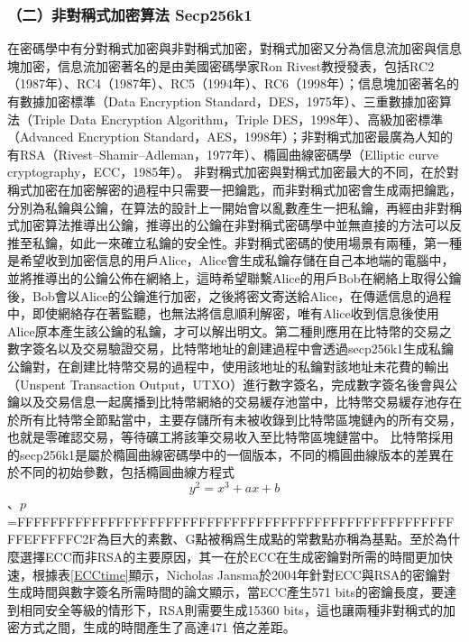 				\subsubsection{（二）非對稱式加密算法 Secp256k1}
				在密碼學中有分對稱式加密與非對稱式加密，對稱式加密又分為信息流加密與信息塊加密，信息流加密著名的是由美國密碼學家Ron Rivest教授發表，包括RC2（1987年）\supercite{OnthedesignandsecurityofRC2}、RC4（1987年）\supercite{Rc4}、RC5（1994年）\supercite{TheRC5encryptionalgorithm}、RC6（1998年）\supercite{TheRC6blockcipher.v1.1August201998}；信息塊加密著名的有數據加密標準（Data Encryption Standard，DES，1975年）\supercite{Dataencryptionstandard}、三重數據加密算法（Triple Data Encryption Algorithm，Triple DES，1998年）\supercite{TrippleDataEncryptionAlgorithmModesofOperation}、高級加密標準（Advanced Encryption Standard，AES，1998年）\supercite{ThedesignofRijndael:AES-theadvancedencryptionstandard}；非對稱式加密最廣為人知的有RSA（Rivest–Shamir–Adleman，1977年）\supercite{Cryptographiccommunicationssystemandmethod}、橢圓曲線密碼學（Elliptic curve cryptography，ECC，1985年）\supercite{Ellipticcurvecryptosystems}。
				非對稱式加密與對稱式加密最大的不同，在於對稱式加密在加密解密的過程中只需要一把鑰匙，而非對稱式加密會生成兩把鑰匙，分別為私鑰與公鑰，在算法的設計上一開始會以亂數產生一把私鑰，再經由非對稱式加密算法推導出公鑰，推導出的公鑰在非對稱式密碼學中並無直接的方法可以反推至私鑰，如此一來確立私鑰的安全性。非對稱式密碼的使用場景有兩種，第一種是希望收到加密信息的用戶Alice，Alice會生成私鑰存儲在自己本地端的電腦中，並將推導出的公鑰公佈在網絡上，這時希望聯繫Alice的用戶Bob在網絡上取得公鑰後，Bob會以Alice的公鑰進行加密，之後將密文寄送給Alice，在傳遞信息的過程中，即使網絡存在著監聽，也無法將信息順利解密，唯有Alice收到信息後使用Alice原本產生該公鑰的私鑰，才可以解出明文。第二種則應用在比特幣的交易之數字簽名以及交易驗證交易，比特幣地址的創建過程中會透過secp256k1生成私鑰公鑰對，在創建比特幣交易的過程中，使用該地址的私鑰對該地址未花費的輸出（Unspent Transaction Output，UTXO）\supercite{bitcoinpaper}進行數字簽名，完成數字簽名後會與公鑰以及交易信息一起廣播到比特幣網絡的交易緩存池當中，比特幣交易緩存池存在於所有比特幣全節點當中，主要存儲所有未被收錄到比特幣區塊鏈內的所有交易，也就是零確認交易，等待礦工將該筆交易收入至比特幣區塊鏈當中。
				比特幣採用的secp256k1是屬於橢圓曲線密碼學中的一個版本，不同的橢圓曲線版本的差異在於不同的初始參數，包括橢圓曲線方程式$$y^2=x^3+ax+b$$、$p$=FFFFFFFFFFFFFFFFFFFFFFFFFFFFFFFFFFFFFFFFFFFFFFFFFFFFFFFEFFFFFC2F為巨大的素數、G點被稱爲⽣成點的常數點亦稱為基點。至於為什麼選擇ECC而非RSA的主要原因，其一在於ECC在生成密鑰對所需的時間更加快速，根據表\ref{ECCtime}顯示，Nicholas Jansma於2004年針對ECC與RSA的密鑰對生成時間與數字簽名所需時間的論文\supercite{Performancecomparisonofellipticcurveandrsadigitalsignatures}顯示，當ECC產生571 bits的密鑰長度，要達到相同安全等級的情形下，RSA則需要⽣成15360 bits，這也讓兩種非對稱式的加密方式之間，⽣成的時間產生了⾼達471 倍之差距。

